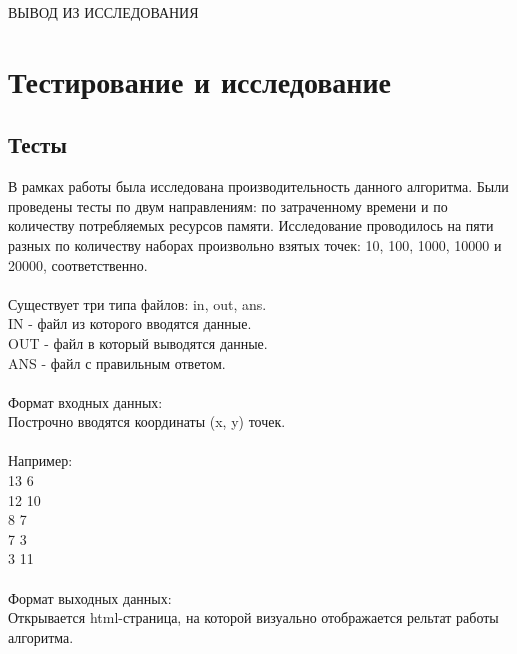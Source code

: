 \newpage
ВЫВОД ИЗ ИССЛЕДОВАНИЯ

\section{Тестирование и исследование}
\subsection{Тесты}
В рамках работы была исследована производительность данного алгоритма.  Были проведены тесты по двум направлениям: по затраченному времени и по количеству потребляемых ресурсов памяти. Исследование проводилось на пяти разных по количеству наборах произвольно взятых точек: 10, 100, 1000, 10000 и 20000, соответственно.\\
\bigskip
\\Существует три типа файлов: in, out, ans.
\bigskip
\\IN - файл из которого вводятся данные.\\
OUT - файл в который выводятся данные.\\
ANS - файл с правильным ответом.\\
\bigskip
\\Формат входных данных:\\
Построчно вводятся координаты (x, y) точек.\\
\\Например:\\
13 6\\
12 10\\
8 7\\
7 3\\
3 11\\
\bigskip
\\Формат выходных данных:\\
Открывается html-страница, на которой визуально отображается рельтат работы алгоритма.



